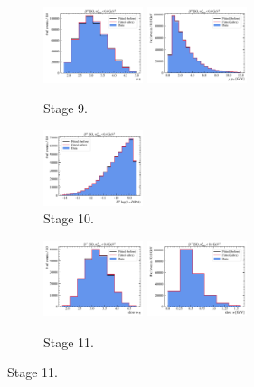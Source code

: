 \begin{figure}[htb]\ContinuedFloat
    \begin{subfigure}{\textwidth}
        \centering
        \includegraphics[width=0.32\textwidth]{./figs-mc-correction/reweighting-final/plot_step9-D0_iso-mu_eta.pdf}
        \includegraphics[width=0.32\textwidth]{./figs-mc-correction/reweighting-final/plot_step9-D0_iso-mu_pt.pdf}
        \caption{Stage 9.}
    \end{subfigure}

    \begin{subfigure}{\textwidth}
        \centering
        \includegraphics[width=0.32\textwidth]{./figs-mc-correction/reweighting-final/plot_step10-D0_iso-d0_comp2.pdf}
        \caption{Stage 10.}
    \end{subfigure}

    \begin{subfigure}{\textwidth}
        \centering
        \includegraphics[width=0.32\textwidth]{./figs-mc-correction/reweighting-final/plot_step11-Dst_iso-spi_eta.pdf}
        \includegraphics[width=0.32\textwidth]{./figs-mc-correction/reweighting-final/plot_step11-Dst_iso-spi_pt.pdf}
        \caption{Stage 11.}
    \end{subfigure}


\end{figure}
